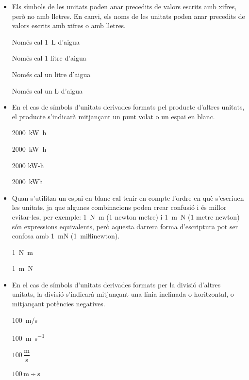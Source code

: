 \begin{itemize}
\item Els símbols de les unitats  poden anar precedits de valors escrits amb xifres, però no amb lletres. En canvi, els noms de les unitats poden anar precedits de valors escrits amb xifres o amb lletres. 

\textcolor{Green}\faCheckSquare{} Només cal \qty{1}{L} d'aigua

\textcolor{Green}\faCheckSquare{} Només cal 1 litre d'aigua

\textcolor{Green}\faCheckSquare{} Només cal un litre d'aigua

\textcolor{Red}\faTimesCircle{} Només cal un L d'aigua


\item En el cas de símbols d'unitats derivades formats pel producte
d'altres unitats, el producte s'indicarà mitjançant un punt volat o
un espai en blanc.

\textcolor{Green}\faCheckSquare{} \qty[inter-unit-product=\cdot]{2000}{kW.h}

\textcolor{Green}\faCheckSquare{} \qty{2000}{kW.h}

\textcolor{Red}\faTimesCircle{} 2000 kW-h

\textcolor{Red}\faTimesCircle{} \qty{2000}{kWh}

\item Quan s'utilitza un espai en blanc cal tenir en compte  l'ordre en què s'escriuen
les unitats, ja que algunes combinacions poden crear confusió i
és millor evitar-les, per exemple: \qty{1}{N.m} (1 newton metre) i
\qty{1}{m.N} (1 metre newton) són expressions equivalents, però
aquesta darrera forma d'escriptura pot ser confosa amb \qty{1}{mN} (1~miŀlinewton).

\textcolor{Green}\faCheckSquare{}  \qty{1}{N.m}

\textcolor{Blue}\faExclamationTriangle{} \qty{1}{m.N}

\item En el cas de símbols d'unitats derivades formats per la divisió
d'altres unitats, la divisió s'indicarà mitjançant una línia
inclinada o horitzontal, o mitjançant potències negatives.

\textcolor{Green}\faCheckSquare{} \qty{100}{m/s}

\textcolor{Green}\faCheckSquare{} \qty{100}{m.s^{-1}}

\textcolor{Green}\faCheckSquare{} $100\,\dfrac{\text{m}}{\text{s}}$

\textcolor{Red}\faTimesCircle{} $100\,\text{m}\div\text{s}$



\end{itemize}
